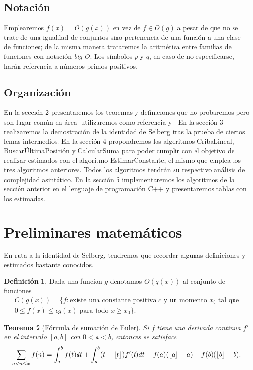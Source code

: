 \documentclass[10pt]{article}
\DeclarePairedDelimiter\floor{\lfloor}{\rfloor}
\newtheorem{theorem}{Teorema}
\theoremstyle{definition}
\newtheorem{defn}[theorem]{Definici\'on}
\theoremstyle{remark}
\begin{document}
\subsection{Notaci\'on}
Emplearemos $f(x) = O(g(x))$ en vez de $f \in O(g)$
a pesar de que no se trate de una igualdad de conjuntos sino
pertenencia de una funci\'on a una clase de funciones; 
de la misma manera
trataremos la aritm\'etica entre familias de funciones con notaci\'on {\it big $O$}.
Los s\'imbolos $p$ y $q$, en caso de no especificarse,
har\'an referencia a n\'umeros primos positivos.

\subsection{Organizaci\'on}
En la secci\'on 2 presentaremos los teoremas y definiciones que no probaremos pero 
son lugar com\'un en \'area, utilizaremos como referencia \cite{Apostol} y \cite{CLRS}.
En la secci\'on 3 realizaremos la demostraci\'on de la identidad de Selberg tras la prueba de ciertos lemas intermedios.
En la secci\'on 4 propondremos los algoritmos CribaLineal, Buscar\'UltimaPosici\'on y CalcularSuma 
para poder cumplir con el objetivo de realizar estimados con el algoritmo EstimarConstante, el mismo que emplea los tres algoritmos anteriores. 
Todos los algoritmos tendr\'an su respectivo an\'alisis de complejidad asint\'otico.
En la secci\'on 5 implementaremos los algoritmos de la secci\'on anterior en el lenguaje de programaci\'on C++ y
presentaremos tablas con los estimados.

\section{Preliminares matem\'aticos}

En ruta a la identidad de Selberg, tendremos que recordar algunas definiciones y estimados bastante conocidos.

\begin{defn}
Dada una funci\'on $g$ denotamos $O(g(x))$ al conjunto de funciones
\[
\begin{gathered}
O(g(x)) = \{f : \text{existe una constante positiva } c \text{ y un momento } x_0 \text{ tal que}\\
0 \leq f(x) \leq cg(x) \text{ para todo } x \geq x_0\}.
\end{gathered}
\]
\end{defn}

\begin{theorem}[F\'ormula de sumaci\'on de Euler]
Si $f$ tiene una derivada continua $f'$ en el intervalo $[a, b]$ con $0 < a < b$, 
entonces se satisface 
\[
\sum_{a < n \leq x} f(n) = \int_a^b f(t) dt + \int_a^b (t - \floor{t}) f'(t) dt
+ f(a)(\floor{a} - a) - f(b)(\floor{b} - b).
\]
\end{theorem}
\end{document}
